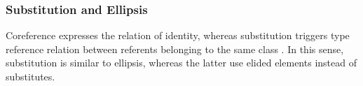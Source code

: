 \documentclass[a4paper]{article}
\begin{document}






\subsubsection{Substitution and Ellipsis}\label{sec:substitution}
Coreference expresses the relation of identity, whereas substitution triggers type reference relation between referents belonging to the same class \cite{KunzSteiner2013,deBeaugrandeDressler1981}. In this sense,
substitution is similar to ellipsis, whereas the latter use elided elements
instead of substitutes.
\end{document}
